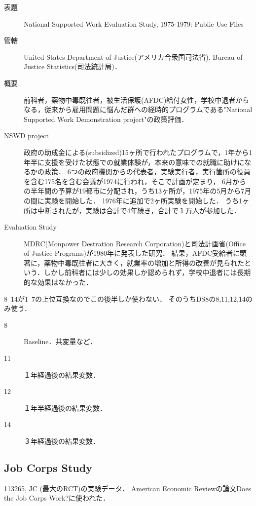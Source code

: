 \documentclass[uplatex,dvipdfmx]{jsreport}
\begin{document}
\begin{description}
    \item[表題] National Supported Work Evaluation Study, 1975-1979: Public Use Files
    \item[管轄] United States Department of Justice(アメリカ合衆国司法省). Bureau of Justice Statistics(司法統計局)．
    \item[概要] 前科者，薬物中毒既往者，被生活保護(AFDC)給付女性，学校中退者からなる，従来から雇用問題に悩んだ群への経時的プログラムである"National Supported Work Demonstration project"の政策評価．
    \item[NSWD project] 政府の助成金による(subsidized)15ヶ所で行われたプログラムで，1年から1年半に支援を受けた状態での就業体験が，本来の意味での就職に助けになるかの政策．
    6つの政府機関からの代表者，実験実行者，実行箇所の役員を含む175名を含む会議が1974に行われ，そこで計画が定まり，
    6月からの半年間の予算が19都市に分配され，うち13ヶ所が，1975年の5月から7月の間に実験を開始した．
    1976年に追加で2ヶ所実験を開始した．
    うち1ヶ所は中断されたが，実験は合計で4年続き，合計で１万人が参加した．
    \item[Evaluation Study] MDRC(Monpower Destration Research Corporation)と司法計画省(Office of Justice Programs)が1980年に発表した研究． 
    結果，AFDC受給者に顕著に，薬物中毒既往者に大きく，就業率の増加と所得の改善が見られたという．しかし前科者には少しの効果しか認められず，学校中退者には長期的な効果はなかった．
\end{description}

8~14が1~7の上位互換なのでこの後半しか使わない．
そのうちDS8の8,11,12,14のみ使う．
\begin{description}
    \item[8] Baseline．共変量など．
    \item[11] １年経過後の結果変数．
    \item[12] １年半経過後の結果変数．
    \item[14] ３年経過後の結果変数．
\end{description}

\subsection{Job Corps Study}

\begin{tcolorbox}[colframe=ForestGreen, colback=ForestGreen!10!white,breakable,colbacktitle=ForestGreen!40!white,coltitle=black,fonttitle=\bfseries\sffamily,
title=]
    113265, JC (最大のRCT)の実験データ．
    American Economic Reviewの論文Does the Job Corps Work?\cite{JobCorps}に使われた．
\end{tcolorbox}
\end{document}
